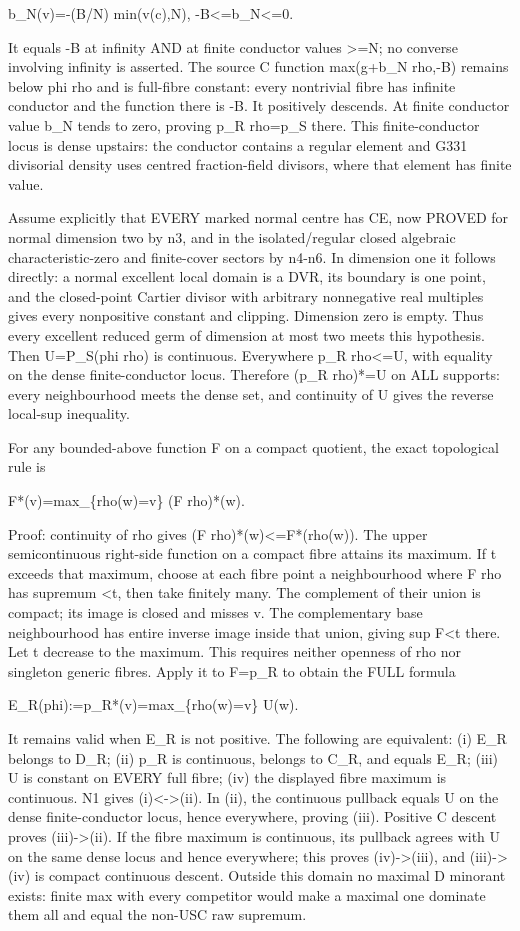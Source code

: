 \documentclass[11pt]{article}
\begin{document}
    b\_N(v)=-(B/N) min(v(c),N),   -B<=b\_N<=0.

It equals -B at infinity AND at finite conductor values >=N; no converse involving infinity is asserted. The source C function max(g+b\_N rho,-B) remains below phi rho and is full-fibre constant: every nontrivial fibre has infinite conductor and the function there is -B. It positively descends. At finite conductor value b\_N tends to zero, proving p\_R rho=p\_S there. This finite-conductor locus is dense upstairs: the conductor contains a regular element and G331 divisorial density uses centred fraction-field divisors, where that element has finite value.

Assume explicitly that EVERY marked normal centre has CE, now PROVED for normal dimension two by n3, and in the isolated/regular closed algebraic characteristic-zero and finite-cover sectors by n4-n6. In dimension one it follows directly: a normal excellent local domain is a DVR, its boundary is one point, and the closed-point Cartier divisor with arbitrary nonnegative real multiples gives every nonpositive constant and clipping. Dimension zero is empty. Thus every excellent reduced germ of dimension at most two meets this hypothesis. Then U=P\_S(phi rho) is continuous. Everywhere p\_R rho<=U, with equality on the dense finite-conductor locus. Therefore (p\_R rho)*=U on ALL supports: every neighbourhood meets the dense set, and continuity of U gives the reverse local-sup inequality.

For any bounded-above function F on a compact quotient, the exact topological rule is

    F*(v)=max\_\{rho(w)=v\} (F rho)*(w).

Proof: continuity of rho gives (F rho)*(w)<=F*(rho(w)). The upper semicontinuous right-side function on a compact fibre attains its maximum. If t exceeds that maximum, choose at each fibre point a neighbourhood where F rho has supremum <t, then take finitely many. The complement of their union is compact; its image is closed and misses v. The complementary base neighbourhood has entire inverse image inside that union, giving sup F<t there. Let t decrease to the maximum. This requires neither openness of rho nor singleton generic fibres. Apply it to F=p\_R to obtain the FULL formula

    E\_R(phi):=p\_R*(v)=max\_\{rho(w)=v\} U(w).

It remains valid when E\_R is not positive. The following are equivalent: (i) E\_R belongs to D\_R; (ii) p\_R is continuous, belongs to C\_R, and equals E\_R; (iii) U is constant on EVERY full fibre; (iv) the displayed fibre maximum is continuous. N1 gives (i)<->(ii). In (ii), the continuous pullback equals U on the dense finite-conductor locus, hence everywhere, proving (iii). Positive C descent proves (iii)->(ii). If the fibre maximum is continuous, its pullback agrees with U on the same dense locus and hence everywhere; this proves (iv)->(iii), and (iii)->(iv) is compact continuous descent. Outside this domain no maximal D minorant exists: finite max with every competitor would make a maximal one dominate them all and equal the non-USC raw supremum.
\end{document}
